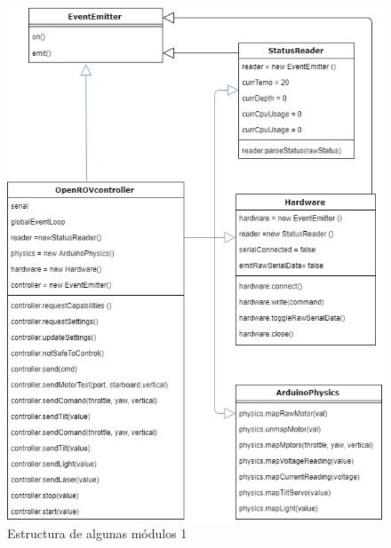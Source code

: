 \begin{figure}[H]
    \centering
    \includegraphics[scale=0.65]{partes/ImgSophia/ApendiceC/ApiCockpit2.png}
    \caption{Estructura de algunas módulos 1}
    \label{fig:Apicockpit2}
\end{figure}

